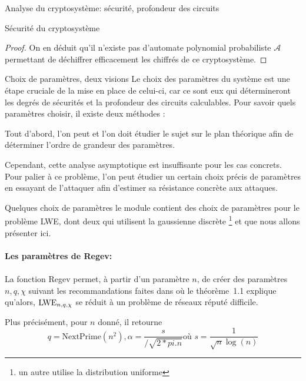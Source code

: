 \begin{section}{Analyse du cryptosystème: sécurité, profondeur des circuits}
\begin{subsection}{Sécurité du cryptosystème}
\begin{proof}
	On en déduit qu'il n'existe pas d'automate polynomial probabiliste
	$\mathcal{A}$ permettant de déchiffrer efficacement les chiffrés de ce cryptosystème.
	\end{proof}
	
	\end{subsection}
	\begin{subsection}{Choix de paramètres, deux visions}
	Le choix des paramètres du système est une étape cruciale de la mise en place de celui-ci,
	car ce sont eux qui détermineront les degrés de sécurités et la profondeur des circuits calculables.
	Pour savoir quels paramètres choisir, il existe deux méthodes :
	
	Tout d'abord, l'on peut et l'on doit étudier le sujet sur le plan théorique afin de déterminer
	l'ordre de grandeur des paramètres.
	
	Cependant, cette analyse asymptotique est insuffisante pour les cas concrets. Pour palier à ce
	problème, l'on peut étudier un certain choix précis de paramètres en essayant de l'attaquer afin
	d'estimer sa résistance concrète aux attaques.
	
	\begin{subsubsection}{Quelques choix de paramètres}
	le module  contient des choix de paramètres pour
	le problème LWE, dont deux qui utilisent la gaussienne discrète
	\footnote{un autre utilise la distribution uniforme}
	et que nous allons présenter ici.

	\paragraph{}
	\textbf{Les paramètres de Regev:}

	\paragraph{}
		La fonction Regev permet, à partir d'un paramètre $n$, de 
		créer des paramètres $n, q, \chi$ suivant les recommandations  
		faites dans \cite{STOC:Regev05} où le théorème~1.1 explique 
		qu'alors, $\text{LWE}_{n,q,\chi}$ se réduit à un problème de réseaux réputé 
		difficile.

		Plus précisément, pour $n$ donné, il retourne
		\[q = \text{NextPrime}(n^2), \alpha = \frac{s}{/\sqrt{2*pi.n}} \text{où } s=\frac{1}{\sqrt{n} \log(n)} \]


\end{subsubsection}
\end{subsection}
\end{section}
